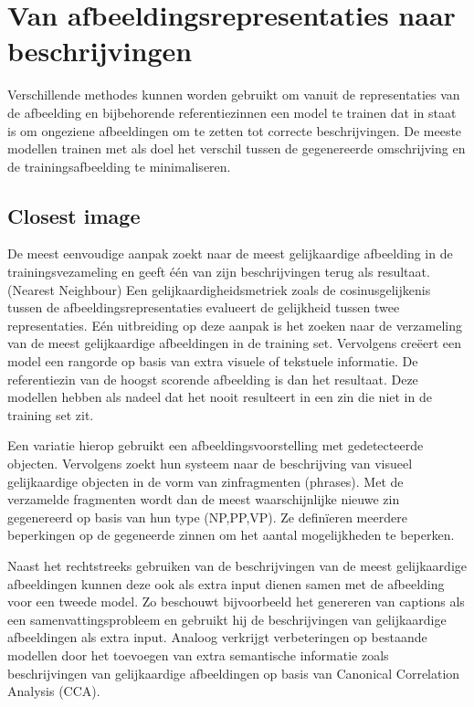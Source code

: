 \section{Van afbeeldingsrepresentaties naar beschrijvingen}
Verschillende methodes kunnen worden gebruikt om vanuit de representaties van de afbeelding en bijbehorende referentiezinnen een model te trainen dat in staat is om ongeziene afbeeldingen om te zetten tot correcte beschrijvingen. 
De meeste modellen trainen met als doel het verschil tussen de gegenereerde omschrijving en de trainingsafbeelding te minimaliseren.

\subsection{Closest image}
De meest eenvoudige aanpak zoekt naar de meest gelijkaardige afbeelding in de trainingsvezameling en geeft \'e\'en van zijn beschrijvingen terug als resultaat. (Nearest Neighbour)  Een gelijkaardigheidsmetriek zoals de cosinusgelijkenis tussen de afbeeldingsrepresentaties evalueert de gelijkheid tussen twee representaties.
E\'en uitbreiding op deze aanpak is het zoeken naar de verzameling van de meest gelijkaardige afbeeldingen in de training set. Vervolgens cre\"eert een model een rangorde op basis van extra visuele of tekstuele informatie. De referentiezin van de hoogst scorende afbeelding is dan het resultaat. \cite{Ordonez2011}\cite{Oliva2006}\cite{Torralba}\cite{Devlin}
Deze modellen hebben als nadeel dat het nooit resulteert in een zin die niet in de training set zit.

Een variatie hierop \cite{Kuznetsova,Gupta} gebruikt een afbeeldingsvoorstelling met gedetecteerde objecten. Vervolgens zoekt hun systeem naar de beschrijving van visueel gelijkaardige objecten in de vorm van zinfragmenten (phrases). Met de verzamelde fragmenten wordt dan de meest waarschijnlijke nieuwe zin gegenereerd op basis van hun type (NP,PP,VP). Ze defin\"ieren meerdere beperkingen op de gegeneerde zinnen om het aantal mogelijkheden te beperken.

Naast het rechtstreeks gebruiken van de beschrijvingen van de meest gelijkaardige afbeeldingen kunnen deze ook als extra input dienen samen met de afbeelding voor een tweede model. Zo beschouwt \cite{Mason} bijvoorbeeld het genereren van captions als een samenvattingsprobleem en gebruikt hij de beschrijvingen van gelijkaardige afbeeldingen als extra input. Analoog verkrijgt \cite{Jia} verbeteringen op bestaande modellen door het toevoegen van extra semantische informatie zoals beschrijvingen van gelijkaardige afbeeldingen op basis van Canonical Correlation Analysis (CCA).
 
